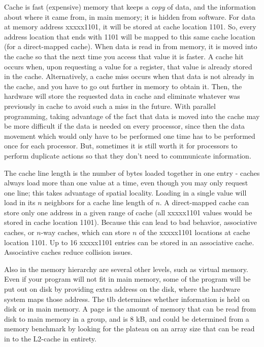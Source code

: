 \documentclass[10pt]{article}
\begin{document}
\begin{flushleft}
Cache is fast (expensive) memory that keeps a \textit{copy} of data, and the information about where it came from, in main memory; it is hidden from software. For data at memory address xxxxx1101, it will be stored at cache location 1101. So, every address location that ends with 1101 will be mapped to this same cache location (for a direct-mapped cache). When data is read in from memory, it is moved into the cache so that the next time you access that value it is faster. A cache hit occurs when, upon requesting a value for a register, that value is already stored in the cache. Alternatively, a cache miss occurs when that data is not already in the cache, and you have to go out further in memory to obtain it. Then, the hardware will store the requested data in cache and eliminate whatever was previously in cache to avoid such a miss in the future. With parallel programming, taking advantage of the fact that data is moved into the cache may be more difficult if the data is needed on every processor, since then the data movement which would only have to be performed one time has to be performed once for each processor. But, sometimes it is still worth it for processors to perform duplicate actions so that they don't need to communicate information.

The cache line length is the number of bytes loaded together in one entry - caches always load more than one value at a time, even though you may only request one line; this takes advantage of spatial locality. Loading in a single value will load in its \(n\) neighbors for a cache line length of \(n\). A direct-mapped cache can store only one address in a given range of cache (all xxxxx1101 values would be stored in cache location 1101). Because this can lead to bad behavior, associative caches, or \(n\)-way caches, which can store \(n\) of the xxxxx1101 locations at cache location 1101. Up to 16 xxxxx1101 entries can be stored in an associative cache. Associative caches reduce collision issues.

Also in the memory hierarchy are several other levels, such as virtual memory. Even if your program will not fit in main memory, some of the program will be put out on disk by providing extra address on the disk, where the hardware system maps those address. The \gls{tlb} determines whether information is held on disk or in main memory. A page is the amount of memory that can be read from disk to main memory in a group, and is 8 kB, and could be determined from a memory benchmark by looking for the plateau on an array size that can be read in to the L2-cache in entirety.


\end{flushleft}
\end{document}

